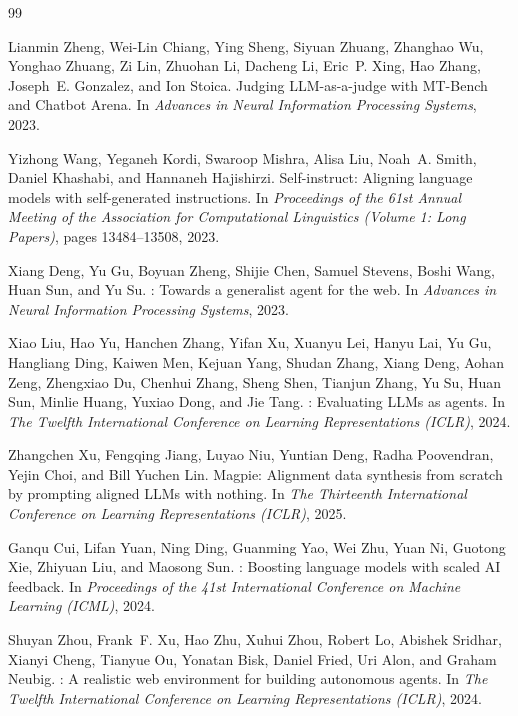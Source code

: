 \begin{thebibliography}{99}

Lianmin Zheng, Wei-Lin Chiang, Ying Sheng, Siyuan Zhuang, Zhanghao Wu, Yonghao Zhuang, Zi Lin, Zhuohan Li, Dacheng Li, Eric~P. Xing, Hao Zhang, Joseph~E. Gonzalez, and Ion Stoica.
\newblock Judging {LLM}-as-a-judge with {MT-Bench} and {Chatbot Arena}.
\newblock In \emph{Advances in Neural Information Processing Systems}, 2023.

Yizhong Wang, Yeganeh Kordi, Swaroop Mishra, Alisa Liu, Noah~A. Smith, Daniel Khashabi, and Hannaneh Hajishirzi.
\newblock Self-instruct: Aligning language models with self-generated instructions.
\newblock In \emph{Proceedings of the 61st Annual Meeting of the Association for Computational Linguistics (Volume 1: Long Papers)}, pages 13484--13508, 2023.

Xiang Deng, Yu Gu, Boyuan Zheng, Shijie Chen, Samuel Stevens, Boshi Wang, Huan Sun, and Yu Su.
: Towards a generalist agent for the web.
\newblock In \emph{Advances in Neural Information Processing Systems}, 2023.

Xiao Liu, Hao Yu, Hanchen Zhang, Yifan Xu, Xuanyu Lei, Hanyu Lai, Yu Gu, Hangliang Ding, Kaiwen Men, Kejuan Yang, Shudan Zhang, Xiang Deng, Aohan Zeng, Zhengxiao Du, Chenhui Zhang, Sheng Shen, Tianjun Zhang, Yu Su, Huan Sun, Minlie Huang, Yuxiao Dong, and Jie Tang.
: Evaluating {LLMs} as agents.
\newblock In \emph{The Twelfth International Conference on Learning Representations (ICLR)}, 2024.

Zhangchen Xu, Fengqing Jiang, Luyao Niu, Yuntian Deng, Radha Poovendran, Yejin Choi, and Bill Yuchen Lin.
\newblock Magpie: Alignment data synthesis from scratch by prompting aligned {LLMs} with nothing.
\newblock In \emph{The Thirteenth International Conference on Learning Representations (ICLR)}, 2025.

Ganqu Cui, Lifan Yuan, Ning Ding, Guanming Yao, Wei Zhu, Yuan Ni, Guotong Xie, Zhiyuan Liu, and Maosong Sun.
: Boosting language models with scaled {AI} feedback.
\newblock In \emph{Proceedings of the 41st International Conference on Machine Learning (ICML)}, 2024.

Shuyan Zhou, Frank~F. Xu, Hao Zhu, Xuhui Zhou, Robert Lo, Abishek Sridhar, Xianyi Cheng, Tianyue Ou, Yonatan Bisk, Daniel Fried, Uri Alon, and Graham Neubig.
: A realistic web environment for building autonomous agents.
\newblock In \emph{The Twelfth International Conference on Learning Representations (ICLR)}, 2024.


\end{thebibliography}
